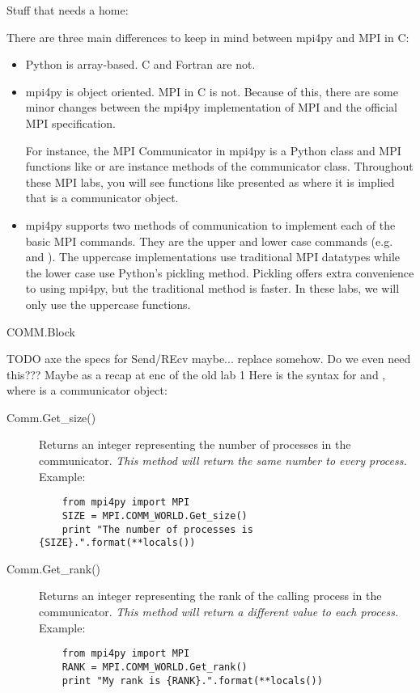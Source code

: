 Stuff that needs a home:

    There are three main differences to keep in mind between mpi4py and MPI in C:
    \begin{itemize}
        \item Python is array-based. C and Fortran are not.
        \item mpi4py is object oriented. MPI in C is not.
            Because of this, there are some minor changes between the mpi4py implementation of
            MPI and the official MPI specification.

            For instance, the MPI Communicator in mpi4py is a Python class and MPI functions
            like  or  are instance methods of the communicator class.
            Throughout these MPI labs, you will see functions like  presented as
             where it is implied that  is a communicator object.
        \item mpi4py supports two methods of communication to implement each of the basic MPI commands.
            They are the upper and lower case commands (e.g.  and ).
            The uppercase implementations use traditional MPI datatypes while the lower case use
            Python's pickling method. Pickling offers extra convenience to using mpi4py,
            but the traditional method is faster. In these labs, we will only use the uppercase functions.
    \end{itemize}

COMM.Block

TODO axe the specs for Send/REcv maybe... replace somehow.
Do we even need this??? Maybe as a recap at enc of the old lab 1
    Here is the syntax for  and , where  is a communicator object:
    \begin{description}
    \item[Comm.Get\_size()]
    Returns an integer representing the number of processes in the communicator.
    \emph{This method will return the same number to every process.}
    Example:
    \begin{lstlisting}
    from mpi4py import MPI
    SIZE = MPI.COMM_WORLD.Get_size()
    print "The number of processes is {SIZE}.".format(**locals())
    \end{lstlisting}
    \item[Comm.Get\_rank()]
    Returns an integer representing the rank of the calling process in the communicator.
    \emph{This method will return a different value to each process.}
    Example:
    \begin{lstlisting}
    from mpi4py import MPI
    RANK = MPI.COMM_WORLD.Get_rank()
    print "My rank is {RANK}.".format(**locals())
    \end{lstlisting}
    \end{description}

